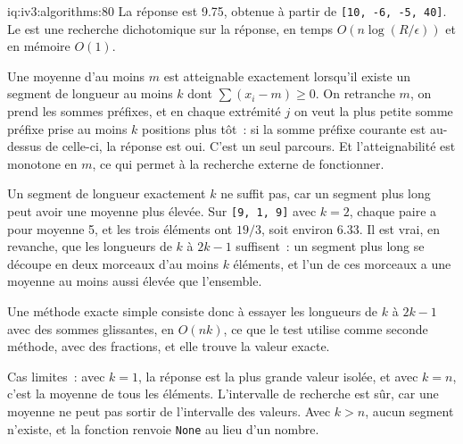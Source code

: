 \begin{solution}{iq:iv3:algorithms:80}
La réponse est 9.75, obtenue à partir de \texttt{[10, -6, -5, 40]}. Le  est une recherche dichotomique sur la réponse, en temps $O(n \log(R/\epsilon))$ et en mémoire $O(1)$.
\label{lst:iv3:al:bestmean}

Une moyenne d'au moins $m$ est atteignable exactement lorsqu'il existe un segment de longueur au moins $k$ dont $\sum (x_i - m) \ge 0$. On retranche $m$, on prend les sommes préfixes, et en chaque extrémité $j$ on veut la plus petite somme préfixe prise au moins $k$ positions plus tôt~: si la somme préfixe courante est au-dessus de celle-ci, la réponse est oui. C'est un seul parcours. Et l'atteignabilité est monotone en $m$, ce qui permet à la recherche externe de fonctionner.

Un segment de longueur exactement $k$ ne suffit pas, car un segment plus long peut avoir une moyenne plus élevée. Sur \texttt{[9, 1, 9]} avec $k = 2$, chaque paire a pour moyenne 5, et les trois éléments ont $19/3$, soit environ 6.33. Il est vrai, en revanche, que les longueurs de $k$ à $2k - 1$ suffisent~: un segment plus long se découpe en deux morceaux d'au moins $k$ éléments, et l'un de ces morceaux a une moyenne au moins aussi élevée que l'ensemble.

Une méthode exacte simple consiste donc à essayer les longueurs de $k$ à $2k - 1$ avec des sommes glissantes, en $O(nk)$, ce que le test utilise comme seconde méthode, avec des fractions, et elle trouve la valeur exacte.

Cas limites~: avec $k = 1$, la réponse est la plus grande valeur isolée, et avec $k = n$, c'est la moyenne de tous les éléments. L'intervalle de recherche est sûr, car une moyenne ne peut pas sortir de l'intervalle des valeurs. Avec $k > n$, aucun segment n'existe, et la fonction renvoie \texttt{None} au lieu d'un nombre.

\end{solution}
